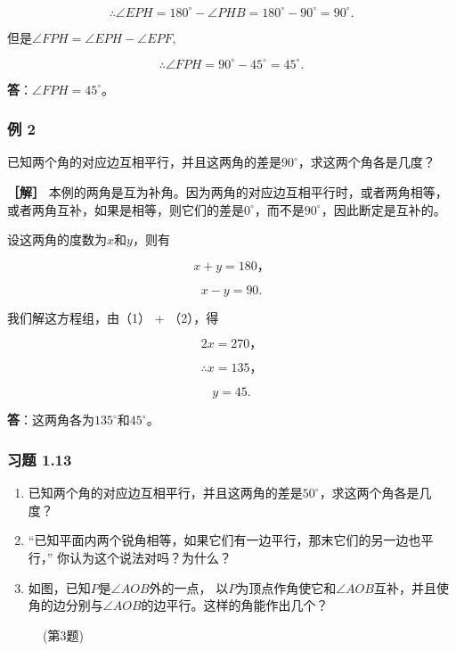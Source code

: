 \[
\therefore \angle EPH = 180 ^{\circ} - \angle PHB = 180 ^{\circ} - 90 ^{\circ} = 90 ^{\circ}.
\]

但是\(\angle FPH = \angle EPH - \angle EPF,\)

\[
\therefore \angle FPH = 90 ^{\circ} - 45 ^{\circ} = 45 ^{\circ}.
\]

\textbf{答}：\(\angle FPH = 45^{\circ}\)。

\subsubsection{例 2}

已知两个角的对应边互相平行，并且这两角的差是\(90^{\circ}\)，求这两个角各是几度？

\textbf{［解］}
本例的两角是互为补角。因为两角的对应边互相平行时，或者两角相等，或者两角互补，如果是相等，则它们的差是\(0^{\circ}\)，而不是\(90^{\circ}\)，因此断定是互补的。

设这两角的度数为\(x\)和\(y\)，则有

\[
x + y = 180\text{，} \tag {1}
\]

\[
x - y = 90. \tag {2}
\]

我们解这方程组，由（1） + （2），得

\[
2 x = 270\text{，}
\]

\[
\therefore x = 135\text{，}
\]

\[
y = 45.
\]

\textbf{答}：这两角各为\(135^{\circ}\)和\(45^{\circ}\)。

\subsubsection{习题 1.13}

\begin{enumerate}
\item
  已知两个角的对应边互相平行，并且这两角的差是\(50^{\circ}\)，求这两个角各是几度？
\item
  ``已知平面内两个锐角相等，如果它们有一边平行，那末它们的另一边也平行，''
  你认为这个说法对吗？为什么？
\item
  如图，已知\(P\)是\(\angle AOB\)外的一点，
  以\(P\)为顶点作角使它和\(\angle AOB\)互补，并且使角的边分别与\(\angle AOB\)的边平行。这样的角能作出几个？
\end{enumerate}

\begin{figure}
\centering
{}
\caption{(第3题)}
\end{figure}

